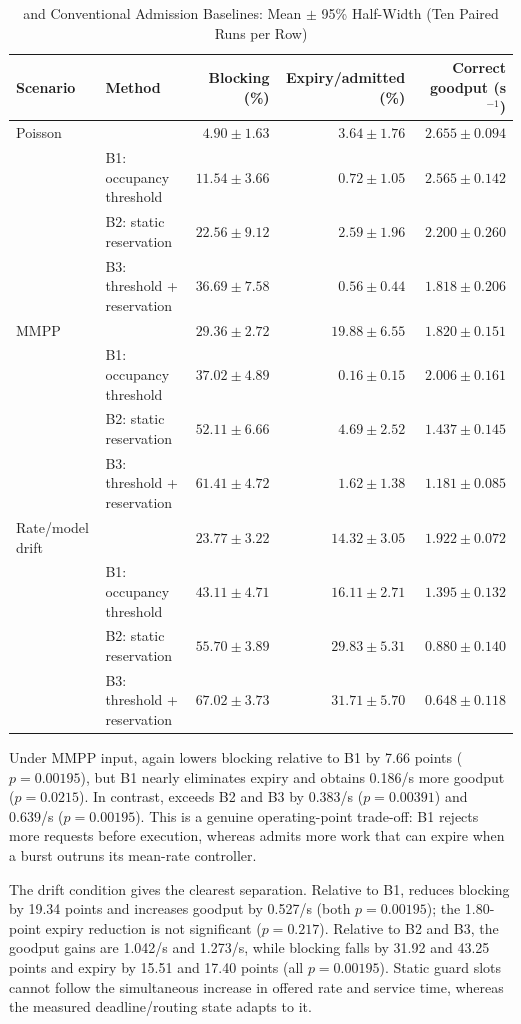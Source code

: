 \begin{table}[t]
\centering
\caption{\method{} and Conventional Admission Baselines: Mean $\pm$ 95\% Half-Width (Ten Paired Runs per Row)}
\label{tab:standard-baselines}
\small
\begin{tabular}{@{}llrrr@{}}
\toprule
Scenario & Method & Blocking (\%) & Expiry/admitted (\%) & Correct goodput (s$^{-1}$) \\
\midrule
Poisson & \method{} & $4.90\pm1.63$ & $3.64\pm1.76$ & $2.655\pm0.094$ \\
 & B1: occupancy threshold & $11.54\pm3.66$ & $0.72\pm1.05$ & $2.565\pm0.142$ \\
 & B2: static reservation & $22.56\pm9.12$ & $2.59\pm1.96$ & $2.200\pm0.260$ \\
 & B3: threshold + reservation & $36.69\pm7.58$ & $0.56\pm0.44$ & $1.818\pm0.206$ \\
\midrule
MMPP & \method{} & $29.36\pm2.72$ & $19.88\pm6.55$ & $1.820\pm0.151$ \\
 & B1: occupancy threshold & $37.02\pm4.89$ & $0.16\pm0.15$ & $2.006\pm0.161$ \\
 & B2: static reservation & $52.11\pm6.66$ & $4.69\pm2.52$ & $1.437\pm0.145$ \\
 & B3: threshold + reservation & $61.41\pm4.72$ & $1.62\pm1.38$ & $1.181\pm0.085$ \\
\midrule
Rate/model drift & \method{} & $23.77\pm3.22$ & $14.32\pm3.05$ & $1.922\pm0.072$ \\
 & B1: occupancy threshold & $43.11\pm4.71$ & $16.11\pm2.71$ & $1.395\pm0.132$ \\
 & B2: static reservation & $55.70\pm3.89$ & $29.83\pm5.31$ & $0.880\pm0.140$ \\
 & B3: threshold + reservation & $67.02\pm3.73$ & $31.71\pm5.70$ & $0.648\pm0.118$ \\
\bottomrule
\end{tabular}
\end{table}

Under MMPP input, \method{} again lowers blocking relative to B1 by 7.66 points ($p=0.00195$), but B1 nearly eliminates expiry and obtains 0.186/s more goodput ($p=0.0215$). In contrast, \method{} exceeds B2 and B3 by 0.383/s ($p=0.00391$) and 0.639/s ($p=0.00195$). This is a genuine operating-point trade-off: B1 rejects more requests before execution, whereas \method{} admits more work that can expire when a burst outruns its mean-rate controller.

The drift condition gives the clearest separation. Relative to B1, \method{} reduces blocking by 19.34 points and increases goodput by 0.527/s (both $p=0.00195$); the 1.80-point expiry reduction is not significant ($p=0.217$). Relative to B2 and B3, the goodput gains are 1.042/s and 1.273/s, while blocking falls by 31.92 and 43.25 points and expiry by 15.51 and 17.40 points (all $p=0.00195$). Static guard slots cannot follow the simultaneous increase in offered rate and service time, whereas the measured deadline/routing state adapts to it.

